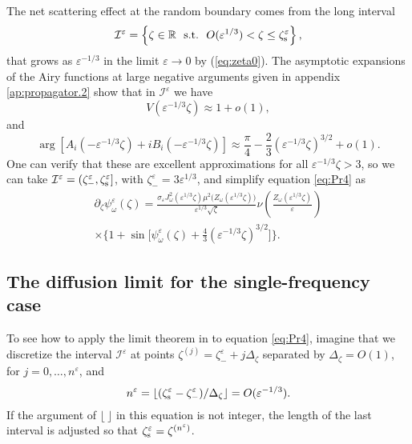 \documentclass[final]{siamltex}
\begin{document}
The net scattering effect at the random boundary comes from the long
interval
\begin{equation*}
\mathcal{I}^{\varepsilon} = \left\{ \zeta \in \mathbb{R}~~ \mbox{s.t.} ~ ~ O({\varepsilon}^{1/3}) < 
\zeta \le \zeta_{\rm s}^{\varepsilon} \right\},
\end{equation*} 
that grows as ${\varepsilon}^{-1/3}$ in the limit ${\varepsilon} \to 0$ by (\ref{eq:zeta0}). The asymptotic
expansions of the Airy functions at large negative arguments given in
appendix \ref{ap:propagator.2} show that in $\mathcal{I}^{\varepsilon}$ we have 
\begin{equation}
V({\varepsilon}^{-1/3} \zeta) \approx 1 + o(1),
\label{eq:Pr7}
\end{equation}
and 
\begin{equation}
\arg\left[A_i(-{\varepsilon}^{-1/3} \zeta) + i B_i(-{\varepsilon}^{-1/3} \zeta)\right]
\approx \frac{\pi}{4} - \frac{2}{3}({\varepsilon}^{-1/3} \zeta)^{3/2} + o(1).
\label{eq:Pr8}
\end{equation}
One can verify that these are excellent approximations for
all ${\varepsilon}^{-1/3} \zeta >3$, so we can take $\mathcal{I}^{\varepsilon} =
(\zeta_{-}^{\varepsilon},\zeta_{\rm s}^{\varepsilon}]$, with $\zeta_{-}^{\varepsilon} = 3 {\varepsilon}^{1/3}$, and
  simplify equation \eqref{eq:Pr4} as
\begin{align}
\partial_\zeta \psi_{\omega}^{\varepsilon}(\zeta) = \frac{\sigma_{\varepsilon}
  J_{\omega}^2({\varepsilon}^{1/3} \zeta)\mu^2 \big(Z_{\omega}({\varepsilon}^{1/3}
  \zeta)\big)}{{\varepsilon}^{1/3} \sqrt{\zeta}} \nu \left(
\frac{Z_{\omega}({\varepsilon}^{1/3} \zeta)}{\varepsilon} \right) \nonumber \\ \times
\Big\{1 + \sin\Big[ \psi_{\omega}^{\varepsilon}(\zeta) + \frac{4}{3}({\varepsilon}^{-1/3}
  \zeta)^{3/2}\Big]\Big\}.
\label{eq:Pr9}
\end{align}

\subsection{The diffusion limit for the single-frequency case}
\label{sect:diflim1}
To see how to apply the limit theorem in \cite{kim1996uniform} to
equation \eqref{eq:Pr4}, imagine that we discretize the interval
$\mathcal{I}^{\varepsilon}$ at points $\zeta^{(j)} = \zeta_{-}^{\varepsilon} + j
\Delta_\zeta$ separated by $\Delta_\zeta = O(1)$, for $j = 0, \ldots,
n^{\varepsilon}$, and 
\begin{equation} 
\label{eq:Pr10a}
n^{\varepsilon} = \lfloor(\zeta_{\rm s}^{\varepsilon}-\zeta_{-}^{\varepsilon})/\Delta_\zeta\rfloor = O({\varepsilon}^{-1/3}). 
\end{equation}
If the argument of $\lfloor ~\rfloor$ in this equation is not integer,
the length of the last interval is adjusted so that 
$\zeta_{\rm s}^{\varepsilon} = \zeta^{(n^{\varepsilon})}$.
\end{document}

